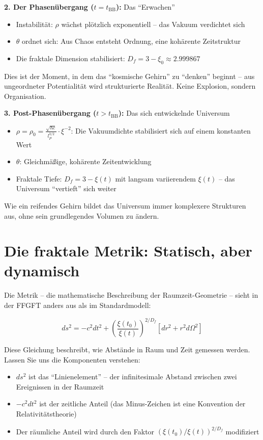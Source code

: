 \documentclass[12pt,a4paper]{article}
\begin{document}
\textbf{2. Der Phasenübergang ($t = t_{\text{BB}}$):} Das ``Erwachen''

\begin{itemize}[leftmargin=*]
\item Instabilität: $\rho$ wächst plötzlich exponentiell -- das Vakuum verdichtet sich
\item $\theta$ ordnet sich: Aus Chaos entsteht Ordnung, eine kohärente Zeitstruktur
\item Die fraktale Dimension stabilisiert: $D_f = 3 - \xi_0 \approx 2.999867$
\end{itemize}

Dies ist der Moment, in dem das ``kosmische Gehirn'' zu ``denken'' beginnt -- aus ungeordneter Potentialität wird strukturierte Realität. Keine Explosion, sondern Organisation.

\textbf{3. Post-Phasenübergang ($t > t_{\text{BB}}$):} Das sich entwickelnde Universum

\begin{itemize}[leftmargin=*]
\item $\rho = \rho_0 = \frac{\sqrt{\hbar c}}{l_P^{3/2}} \cdot \xi^{-2}$: Die Vakuumdichte stabilisiert sich auf einem konstanten Wert
\item $\theta$: Gleichmäßige, kohärente Zeitentwicklung
\item Fraktale Tiefe: $D_f = 3 - \xi(t)$ mit langsam variierendem $\xi(t)$ -- das Universum ``vertieft'' sich weiter
\end{itemize}

Wie ein reifendes Gehirn bildet das Universum immer komplexere Strukturen aus, ohne sein grundlegendes Volumen zu ändern.

\section{Die fraktale Metrik: Statisch, aber dynamisch}

Die Metrik -- die mathematische Beschreibung der Raumzeit-Geometrie -- sieht in der FFGFT anders aus als im Standardmodell:

\begin{equation}
ds^2 = -c^2 dt^2 + \left(\frac{\xi(t_0)}{\xi(t)}\right)^{2/D_f} \left[dr^2 + r^2 d\Omega^2\right]
\end{equation}

Diese Gleichung beschreibt, wie Abstände in Raum und Zeit gemessen werden. Lassen Sie uns die Komponenten verstehen:

\begin{itemize}[leftmargin=*]
\item $ds^2$ ist das ``Linienelement'' -- der infinitesimale Abstand zwischen zwei Ereignissen in der Raumzeit
\item $-c^2 dt^2$ ist der zeitliche Anteil (das Minus-Zeichen ist eine Konvention der Relativitätstheorie)
\item Der räumliche Anteil wird durch den Faktor $(\xi(t_0)/\xi(t))^{2/D_f}$ modifiziert
\end{itemize}
\end{document}
